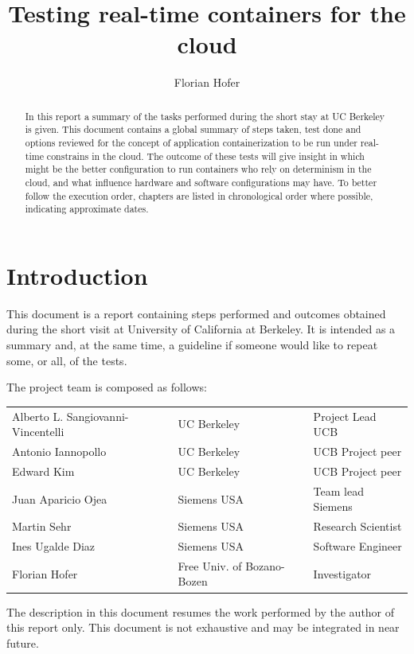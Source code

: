 \documentclass[]{scrartcl}
\title{Testing real-time containers for the cloud}
\author{Florian Hofer}
\date{}
\begin{document}
\maketitle

\begin{abstract}
	In this report a summary of the tasks performed during the short stay at UC Berkeley is given.
	This document contains a global summary of steps taken, test done and options reviewed for the concept of application containerization to be run under real-time constrains in the cloud. The outcome of these tests will give insight in which might be the better configuration to run containers who rely on determinism in the cloud, and what influence hardware and software configurations may have.
	To better follow the execution order, chapters are listed in chronological order  where possible, indicating approximate dates.
\end{abstract}

\section{Introduction}

This document is a report containing steps performed and outcomes obtained during the short visit at University of California at Berkeley. It is intended as a summary and, at the same time, a guideline if someone would like to repeat some, or all, of the tests.

The project team is composed as follows:

\begin{table}[H]
	\begin{tabular}{l l l}
		Alberto L. Sangiovanni-Vincentelli & UC Berkeley & Project Lead UCB \\
		Antonio Iannopollo & UC Berkeley & UCB Project peer \\
		Edward Kim & UC Berkeley & UCB Project peer \\
		Juan Aparicio Ojea & Siemens USA & Team lead Siemens\\
		Martin Sehr & Siemens USA & Research Scientist\\
		Ines Ugalde Diaz & Siemens USA & Software Engineer \\
		Florian Hofer & Free Univ. of Bozano-Bozen & Investigator \\		
	\end{tabular}
\end{table}

The description in this document resumes the work performed by the author of this report only.
This document is not exhaustive and may be integrated in near future.
\end{document}
